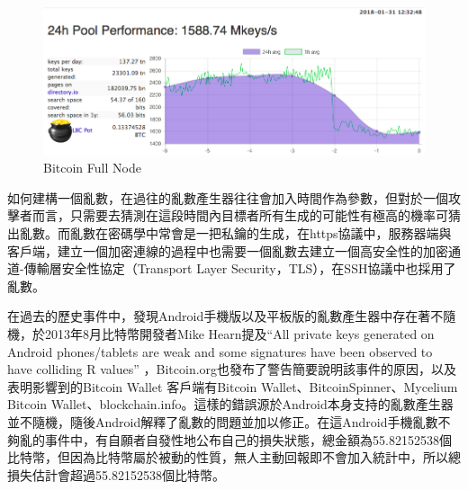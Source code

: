 			\begin{figure}[h]
				\centering
				\includegraphics[width = .9\textwidth]{LBC.png}
				\caption{Bitcoin Full Node\supercite{TheLargeBitcoinCollider}}\label{LBC}
			\end{figure}

			如何建構一個亂數，在過往的亂數產生器往往會加入時間作為參數，但對於一個攻擊者而言，只需要去猜測在這段時間內目標者所有生成的可能性有極高的機率可猜出亂數。而亂數在密碼學中常會是一把私鑰的生成，在https協議中，服務器端與客戶端，建立一個加密連線的過程中也需要一個亂數去建立一個高安全性的加密通道-傳輸層安全性協定（Transport Layer Security，TLS）\supercite{dierks2008transport}，在SSH協議中也採用了亂數。
	
			在過去的歷史事件中，發現Android手機版以及平板版的亂數產生器中存在著不隨機，於2013年8月比特幣開發者Mike Hearn提及“All private keys generated on Android phones/tablets are weak and some signatures have been observed to have colliding R values” \supercite{SomeSecureRandomThoughts}，Bitcoin.org也發布了警告\supercite{AndroidSecurityVulnerability}簡要說明該事件的原因，以及表明影響到的Bitcoin Wallet 客戶端有Bitcoin Wallet、BitcoinSpinner、Mycelium Bitcoin Wallet、blockchain.info。這樣的錯誤源於Android本身支持的亂數產生器並不隨機，隨後Android解釋了亂數的問題並加以修正。在這Android手機亂數不夠亂的事件中，有自願者自發性地公布自己的損失狀態，總金額為55.82152538個比特幣\supercite{Badsignaturesleading}，但因為比特幣屬於被動的性質，無人主動回報即不會加入統計中，所以總損失估計會超過55.82152538個比特幣。

